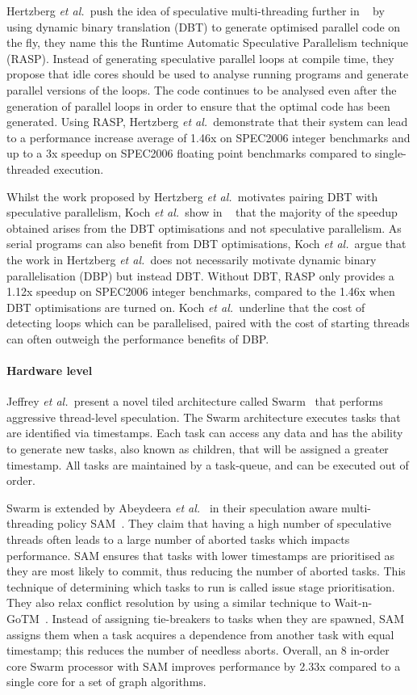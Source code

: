 Hertzberg {\it et al.~}push the idea of speculative multi-threading further in ~\cite{dbtspec2011} by using dynamic binary translation (DBT) to generate optimised parallel code on the fly, they name this the Runtime Automatic Speculative Parallelism technique (RASP).
Instead of generating speculative parallel loops at compile time, they propose that idle cores should be used to analyse running programs and generate parallel versions of the loops.
The code continues to be analysed even after the generation of parallel loops in order to ensure that the optimal code has been generated.
Using RASP, Hertzberg {\it et al.~}demonstrate that their system can lead to a performance increase average of 1.46x on SPEC2006 integer benchmarks and up to a 3x speedup on SPEC2006 floating point benchmarks compared to single-threaded execution.

Whilst the work proposed by Hertzberg {\it et al.~}motivates pairing DBT with speculative parallelism, Koch {\it et al.~}show in ~\cite{koch2013spec} that the majority of the speedup obtained arises from the DBT optimisations and not speculative parallelism.
As serial programs can also benefit from DBT optimisations, Koch {\it et al.~}argue that the work in Hertzberg {\it et al.~}does not necessarily motivate dynamic binary parallelisation (DBP) but instead DBT.
Without DBT, RASP only provides a 1.12x speedup on SPEC2006 integer benchmarks, compared to the 1.46x when DBT optimisations are turned on.
Koch {\it et al.~}underline that the cost of detecting loops which can be parallelised, paired with the cost of starting threads can often outweigh the performance benefits of DBP.
 
\paragraph*{Hardware level}
Jeffrey {\it et al.~}present a novel tiled architecture called Swarm~\cite{swarm2016} that performs aggressive thread-level speculation.
The Swarm architecture executes tasks that are identified via timestamps.
Each task can access any data and has the ability to generate new tasks, also known as children, that will be assigned a greater timestamp.
All tasks are maintained by a task-queue, and can be executed out of order.

Swarm is extended by Abeydeera {\it et al.~} in their speculation aware multi-threading policy SAM~\cite{Abeydeera2017SpecMulti}.
They claim that having a high number of speculative threads often leads to a large number of aborted tasks which impacts performance.
SAM ensures that tasks with lower timestamps are prioritised as they are most likely to commit, thus reducing the number of aborted tasks.
This technique of determining which tasks to run is called issue stage prioritisation.
They also relax conflict resolution by using a similar technique to Wait-n-GoTM~\cite{waitNGo2013}.
Instead of assigning tie-breakers to tasks when they are spawned, SAM assigns them when a task acquires a dependence from another task with equal timestamp; this reduces the number of needless aborts.
Overall, an 8 in-order core Swarm processor with SAM improves performance by 2.33x compared to a single core for a set of graph algorithms.


